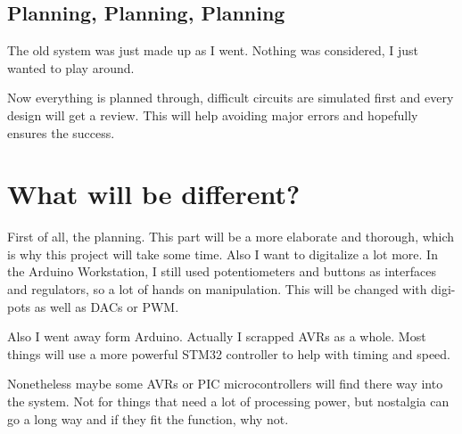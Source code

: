\subsection{Planning, Planning, Planning}
The old system was just made up as I went. Nothing was considered, I just wanted to play around. 

Now everything is planned through, difficult circuits are simulated first and every design will get a review. This will help avoiding major errors and hopefully ensures the success.

\section{What will be different?}
First of all, the planning. This part will be a more elaborate and thorough, which is why this project will take some time. 
Also I want to digitalize a lot more. In the Arduino Workstation, I still used potentiometers and buttons as interfaces and regulators, so a lot of hands on manipulation. This will be changed with digi-pots as well as DACs or PWM. 

Also I went away form Arduino. Actually I scrapped AVRs as a whole. Most things will use a more powerful STM32 controller to help with timing and speed. 

\vspace{1cm}

Nonetheless maybe some AVRs or PIC microcontrollers will find there way into the system. Not for things that need a lot of processing power, but nostalgia can go a long way and if they fit the function, why not.